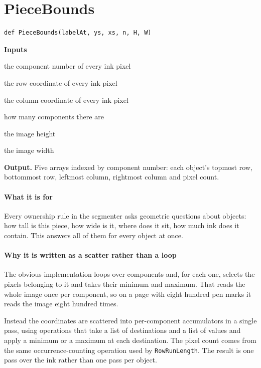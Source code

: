 \section{PieceBounds}
\begin{lstlisting}[style=sig]
def PieceBounds(labelAt, ys, xs, n, H, W)
\end{lstlisting}

\noindent\textbf{Inputs}
\begin{description}[leftmargin=2.2em,style=nextline,font=\normalfont\ttfamily]\setlength\itemsep{1pt}
  \item[{pl}] \normalfont the component number of every ink pixel
  \item[{ys}] \normalfont the row coordinate of every ink pixel
  \item[{xs}] \normalfont the column coordinate of every ink pixel
  \item[{nc}] \normalfont how many components there are
  \item[{H}] \normalfont the image height
  \item[{W}] \normalfont the image width
\end{description}

\noindent\textbf{Output.} Five arrays indexed by component number: each object's topmost row, bottommost row, leftmost column, rightmost column and pixel count.


\paragraph{What it is for}
Every ownership rule in the segmenter asks geometric questions about objects: how tall is this piece, how wide is it, where does it sit, how much ink does it contain. This answers all of them for every object at once.


\paragraph{Why it is written as a scatter rather than a loop}
The obvious implementation loops over components and, for each one, selects the pixels belonging to it and takes their minimum and maximum. That reads the whole image once per component, so on a page with eight hundred pen marks it reads the image eight hundred times.

Instead the coordinates are scattered into per-component accumulators in a single pass, using operations that take a list of destinations and a list of values and apply a minimum or a maximum at each destination. The pixel count comes from the same occurrence-counting operation used by \texttt{RowRunLength}. The result is one pass over the ink rather than one pass per object.


